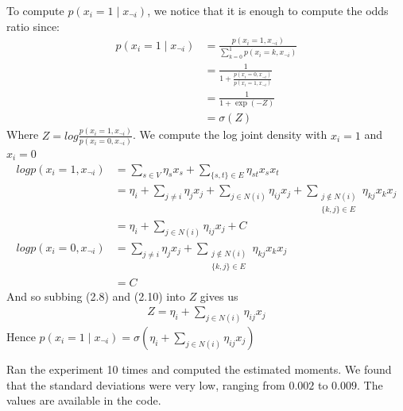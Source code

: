 \documentclass[paper=a4, fontsize=11pt]{scrartcl} %
\numberwithin{equation}{section} %
\numberwithin{figure}{section} %
\numberwithin{table}{section} %
\begin{document}
\begin{enumerate}[(a)]
	To compute $p(x_i = 1 \mid x_{\neg i})$, we notice that it is enough to compute the odds ratio since:
		\begin{align}
		p(x_i = 1 \mid x_{\neg i}) &= \frac{p(x_i = 1, x_{\neg i})}{\sum_{k=0}^{1}p(x_i = k, x_{\neg i})}\\
		&= \frac{1}{1 + \frac{p(x_i = 0, x_{\neg i})}{p(x_i = 1, x_{\neg i})}}\\
		&= \frac{1}{1+\exp(-Z)}\\
		&= \sigma\left(Z\right)
		\end{align}
	Where $Z=log \frac{p(x_i = 1, x_{\neg i})}{p(x_i = 0, x_{\neg i})}$. 
	We compute the log joint density with $x_i=1$ and $x_i=0$
	\begin{align}
		log p(x_i = 1, x_{\neg i}) &=\sum_{s\in V} \eta_s x_s + \sum_{\{s,t\}\in E} \eta_{st} x_s x_t\\
		&=\eta_i + \sum_{j \ne i}\eta_j x_j + \sum_{j\in N(i)} \eta_{ij} x_j + \sum_{\substack{j\not\in N(i) \\ \{k,j\}\in E}} \eta_{kj}x_kx_j\\
		&= \eta_i + \sum_{j\in N(i)} \eta_{ij} x_j + C\\
		log p(x_i = 0, x_{\neg i}) &= \sum_{j \ne i}\eta_j x_j + \sum_{\substack{j\not\in N(i) \\ \{k,j\}\in E}} \eta_{kj}x_kx_j\\
		&=C
	\end{align}
	And so subbing (2.8) and (2.10) into $Z$ gives us
	\begin{align}
	Z = \eta_i + \sum_{j\in N(i)} \eta_{ij} x_j
	\end{align}
	Hence $p(x_i = 1 \mid x_{\neg i}) = \sigma\left(\eta_i + \sum_{j\in N(i)} \eta_{ij} x_j\right)$
	
	Ran the experiment 10 times and computed the estimated moments. We found that the standard deviations were very low, ranging from $0.002$ to $0.009$. The values are available in the code.
	

\end{enumerate}
\end{document}

